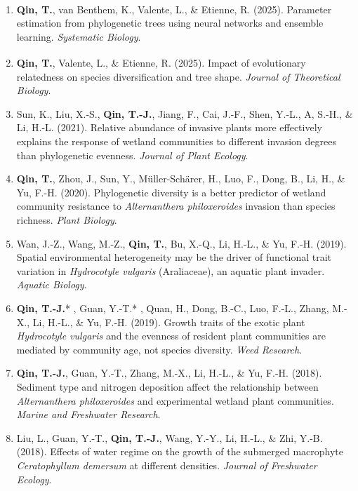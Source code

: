 \begin{enumerate}[leftmargin=1.5em]

  \item \textbf{Qin, T.}, van Benthem, K., Valente, L.\textsuperscript{\dag}, \& Etienne, R.\textsuperscript{\dag} (2025).
        Parameter estimation from phylogenetic trees using neural networks and ensemble learning.
        \emph{Systematic Biology}.

  \item \textbf{Qin, T.}, Valente, L.\textsuperscript{\dag}, \& Etienne, R.\textsuperscript{\dag} (2025).
        Impact of evolutionary relatedness on species diversification and tree shape.
        \emph{Journal of Theoretical Biology}.

  \item Sun, K., Liu, X.-S., \textbf{Qin, T.-J.}, Jiang, F., Cai, J.-F., Shen, Y.-L., A, S.-H., \& Li, H.-L. (2021).
        Relative abundance of invasive plants more effectively explains the response of wetland communities to different invasion degrees than phylogenetic evenness.
        \emph{Journal of Plant Ecology}.

  \item \textbf{Qin, T.}, Zhou, J., Sun, Y., Müller-Schärer, H., Luo, F., Dong, B., Li, H., \& Yu, F.-H. (2020).
        Phylogenetic diversity is a better predictor of wetland community resistance to \emph{Alternanthera philoxeroides} invasion than species richness.
        \emph{Plant Biology}.

  \item Wan, J.-Z., Wang, M.-Z., \textbf{Qin, T.}, Bu, X.-Q., Li, H.-L., \& Yu, F.-H. (2019).
        Spatial environmental heterogeneity may be the driver of functional trait variation in \emph{Hydrocotyle vulgaris} (Araliaceae), an aquatic plant invader.
        \emph{Aquatic Biology}.

  \item \textbf{Qin, T.-J.}* , Guan, Y.-T.* , Quan, H., Dong, B.-C., Luo, F.-L., Zhang, M.-X., Li, H.-L., \& Yu, F.-H. (2019).
        Growth traits of the exotic plant \emph{Hydrocotyle vulgaris} and the evenness of resident plant communities are mediated by community age, not species diversity.
        \emph{Weed Research}.

  \item \textbf{Qin, T.-J.}, Guan, Y.-T., Zhang, M.-X., Li, H.-L., \& Yu, F.-H. (2018).
        Sediment type and nitrogen deposition affect the relationship between \emph{Alternanthera philoxeroides} and experimental wetland plant communities.
        \emph{Marine and Freshwater Research}.

  \item Liu, L., Guan, Y.-T., \textbf{Qin, T.-J.}, Wang, Y.-Y., Li, H.-L., \& Zhi, Y.-B. (2018).
        Effects of water regime on the growth of the submerged macrophyte \emph{Ceratophyllum demersum} at different densities.
        \emph{Journal of Freshwater Ecology}.

\end{enumerate}

